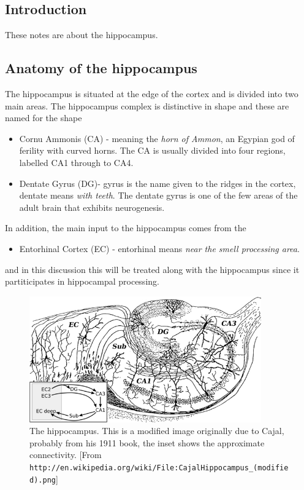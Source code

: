\documentclass[11pt,a4paper]{scrartcl}
\begin{document}
\subsection*{Introduction}
These notes are about the hippocampus.

\subsection*{Anatomy of the hippocampus}

The hippocampus is situated at the edge of the cortex and is divided
into two main areas. The hippocampus complex is distinctive in shape
and these are named for the shape
\begin{itemize}
\item Cornu Ammonis (CA) - meaning the \textsl{horn of Ammon}, an
  Egypian god of ferility with curved horns. The CA is usually divided
  into four regions, labelled CA1 through to CA4.
\item Dentate Gyrus (DG)- gyrus is the name given to the ridges in the
  cortex, dentate means \textsl{with teeth}. The dentate gyrus is one
  of the few areas of the adult brain that exhibits neurogenesis.
\end{itemize}
In addition, the main input to the hippocampus comes from the
\begin{itemize}
\item Entorhinal Cortex (EC) - entorhinal means \textsl{near the smell processing area}. 
\end{itemize}
and in this discussion this will be treated along with the hippocampus
since it partiticipates in hippocampal processing.

\begin{figure}
\begin{center}
\includegraphics[width=10cm]{640px:CajalHippocampus_(modified).png}
\end{center}
\caption{The hippocampus. This is a modified image originally due to
  Cajal, probably from his 1911 book, the inset shows the approximate
  connectivity. [From
    \texttt{http://en.wikipedia.org/wiki/File:CajalHippocampus\_(modified).png}]\label{fig:hippocampus}}
\end{figure}
\end{document}
